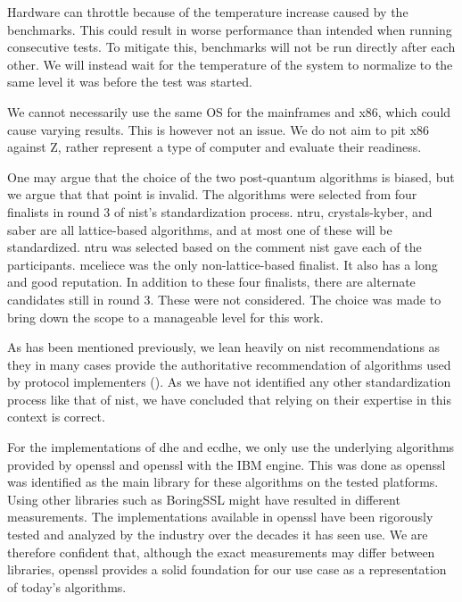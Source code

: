 Hardware can throttle because of the temperature increase caused by the benchmarks. This could result in worse performance than intended when running consecutive tests. To mitigate this, benchmarks will not be run directly after each other. We will instead wait for the temperature of the system to normalize to the same level it was before the test was started.

We cannot necessarily use the same OS for the mainframes and x86, which could cause varying results. This is however not an issue. We do not aim to pit x86 against Z, rather represent a type of computer and evaluate their readiness.

One may argue that the choice of the two post-quantum algorithms is biased, but we argue that that point is invalid. The algorithms were selected from four finalists in round 3 of \gls{nist}'s standardization process. \gls{ntru}, \gls{crystals-kyber}, and \gls{saber} are all lattice-based algorithms, and at most one of these will be standardized. \gls{ntru} was selected based on the comment \gls{nist} gave each of the participants. \gls{mceliece} was the only non-lattice-based finalist. It also has a long and good reputation\cite{nist2020}. In addition to these four finalists, there are alternate candidates still in round 3. These were not considered. The choice was made to bring down the scope to a manageable level for this work.

As has been mentioned previously, we lean heavily on \gls{nist} recommendations as they in many cases provide the authoritative recommendation of algorithms used by protocol implementers (). As we have not identified any other standardization process like that of \gls{nist}, we have concluded that relying on their expertise in this context is correct.

For the implementations of \gls{dhe} and \gls{ecdhe}, we only use the underlying algorithms provided by \gls{openssl} and \gls{openssl} with the IBM engine. This was done as \gls{openssl} was identified as the main library for these algorithms on the tested platforms. Using other libraries such as BoringSSL might have resulted in different measurements. The implementations available in \gls{openssl} have been rigorously tested and analyzed by the industry over the decades it has seen use. We are therefore confident that, although the exact measurements may differ between libraries, \gls{openssl} provides a solid foundation for our use case as a representation of today's algorithms.

